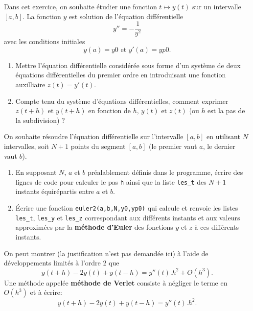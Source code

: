 Dans cet exercice, on souhaite étudier une fonction $t\mapsto y(t)$ sur un intervalle $[a,b]$. La fonction $y$ est solution de l'équation différentielle $$y''=-\displaystyle\frac 1{y^2}$$ avec les conditions initiales $$y(a)=y0 \textrm{ et } y'(a)=yp0.$$

\begin{enumerate}\setcounter{enumi}2\item Mettre l'équation différentielle considérée sous forme d'un système de deux équations différentielles du premier ordre en introduisant une fonction auxilliaire $z(t)=y'(t)$.
	
	\item  Compte tenu du système d'équations différentielles, comment exprimer $z(t+h)$ et $y(t+h)$ en fonction de $h$, $y(t)$ et $z(t)$ (ou $h$ est la pas de la subdivision) ?
	
\end{enumerate}

\bigskip On souhaite résoudre l'équation différentielle  sur l'intervalle $[a,b]$ en utilisant $N$ intervalles, soit $N+1$ points du segment $[a,b]$ (le premier vaut $a$, le dernier vaut $b$).

\begin{enumerate}\setcounter{enumi}4\item En supposant $N$, $a$ et $b$ préalablement définis dans le programme, écrire des lignes de code pour calculer le pas \texttt{h} ainsi que la liste \texttt{les\_t} des $N+1$ instants équirépartis entre $a$ et $b$.
	
	\item \'Ecrire une fonction \texttt{euler2(a,b,N,y0,yp0)} qui calcule et renvoie les listes \texttt{les\_t}, \texttt{les\_y} et \texttt{les\_z} correspondant aux différents instants et aux valeurs approximées par la \textbf{méthode d'Euler} des fonctions $y$ et $z$ à ces différents instants.
	
\end{enumerate}

\bigskip On peut montrer (la justification n'est pas demandée ici) à l'aide de développements limités à l'ordre 2 que $$y(t+h)-2y(t)+y(t-h)=y''(t).h^2+O(h^3).$$
Une méthode appelée \textbf{méthode de Verlet} consiste à négliger le terme en $O(h^3)$ et à écrire:
$$y(t+h)-2y(t)+y(t-h)=y''(t).h^2.$$

